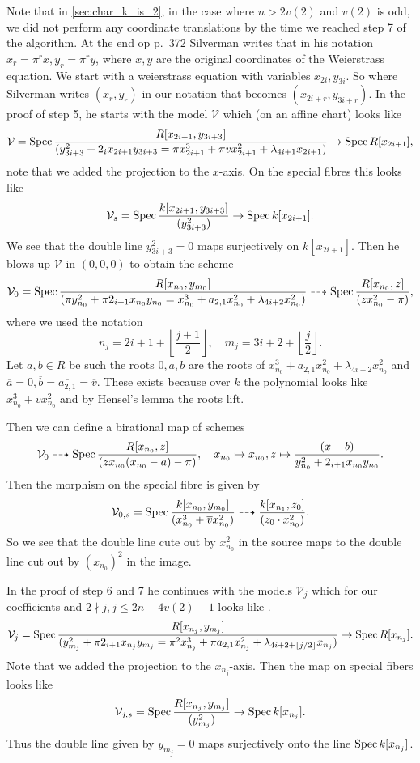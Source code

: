 Note that in \cref{sec:char_k_is_2}, in the case where $n > 2v(2)$ and $v(2)$ is odd, we did not perform any coordinate translations by the time we reached step 7 of the algorithm. 
At the end op p.\ 372 Silverman writes that in his notation $x_{r} = \pi^{r}x, y_{r} = \pi^{r}y$, where $x, y$ are the original coordinates of the Weierstrass equation. 
We start with a weierstrass equation with variables $x_{2i}, y_{3i}$. 
So where Silverman writes $(x_r, y_r)$ in our notation that becomes $(x_{2i+ r}, y_{3i + r})$. 
In the proof of step 5, he starts with the model $\mathcal{V} $ which (on an affine chart) looks like 
\[
	\mathcal{V} = \operatorname{Spec} \frac{R[x_{2i + 1}, y_{3i + 3}]}{(y_{3i + 3}^2 + 2_i x_{2i + 1}y_{3i + 3} = \pi x_{2i + 1}^3 + \pi v x_{2i + 1}^2 + \lambda_{4i + 1} x_{2i + 1})} \to \operatorname{Spec} R[x_{2i + 1}]
,\] 
note that we added the projection to the $x$-axis. 
On the special fibres this looks like 
\[
	\mathcal{V}_s = \operatorname{Spec} \frac{k[x_{2i + 1}, y_{3i + 3}]}{(y_{3i+3}^2)} \to \operatorname{Spec} k[x_{2i + 1}]
.\] 
We see that the double line $y_{3i + 3}^2 = 0$ maps surjectively on $k[x _{2i + 1}]$. 
Then he blows up $\mathcal{V} $ in $(0, 0, 0)$ to obtain the scheme
\[
	\mathcal{V}_0  = \operatorname{Spec} \frac{R[x_{n_0}, y_{m_0}]}{(\pi y_{n_0} ^2 + \pi2_{i + 1} x_{n_0} y_{n_0} = x_{n_0}^3 +  a_{2,1} x_{n_0}^2 + \lambda_{4i + 2} x_{n_0}^2)} \dashrightarrow \operatorname{Spec} \frac{R[x_{n_0}, z]}{(zx_{n_0}^2 - \pi)}
,\] 
where we used the notation \[
	n_j = 2i + 1 + \left\lfloor \frac{j + 1}{2} \right\rfloor,\quad  m_j = 3i + 2 + \left\lfloor \frac{j }{2} \right\rfloor
.\]
Let $a, b \in R$ be such the roots $0, a, b$ are the roots of $x_{n_0}^3 +  a_{2,1} x_{n_0}^2 + \lambda_{4i + 2} x_{n_0}^2$ and $\overline{a} = 0, \overline{b} = \overline{a_{2,1}} = \overline{v}$.  
These exists because over $k$ the polynomial looks like $x_{n_0}^3 + v x_{n_0}^2$ and by Hensel's lemma the roots lift. 

Then we can define a birational map of schemes \[
	\mathcal{V}_0 \dashrightarrow \operatorname{Spec} \frac{R[x_{n_0}, z]}{(z x_{n_0}(x_{n_0} - a) - \pi)},\quad
	x_{n_0} \mapsto x_{n_0}, z\mapsto \frac{(x - b)}{y_{n_0}^2 + 2_{i + 1} x_{n_0}y_{n_0} }
.\] 
Then the morphism on the special fibre is given by \[
	\mathcal{V} _{0, s} = \operatorname{Spec} \frac{k[x_{n_0}, y_{m_0}]}{(x^3_{n_0} + \overline{v} x^2_{n_0})} \dashrightarrow \frac{k[x_{n_1}, z_0]}{(z_0 \cdot x_{n_0}^2)}
.\] 
So we see that the double line cute out by $x_{n_0}^2$ in the source maps to the double line cut out by $(x_{n_0})^2$ in the image. 

In the proof of step 6 and 7 he continues with the models $\mathcal{V} _j$ which for our coefficients and $2 \nmid j, j\le 2n - 4v(2) - 1$ looks like . 
\[
	\mathcal{V} _j = \operatorname{Spec} \frac{R[x_{n_{j}}, y_{m_j}]}{(y_{m_j}^2 + \pi 2_{i + 1} x_{n_j}y_{m_j} = \pi^2 x_{n_j}^3 + \pi a_{2, 1} x_{n_j}^2 + \lambda_{4i + 2 + \left\lfloor j / 2 \right\rfloor} x_{n_j}) } \to \operatorname{Spec} R[x_{n_j}]
.\] 
Note that we added the projection to the $x_{n_j}$-axis. 
Then the map on special fibers looks like \[
	\mathcal{V} _{j, s} = \operatorname{Spec} \frac{R[x_{n_j}, y_{m_j}]}{(y_{m_j}^2)} \to \operatorname{Spec} k[x_{n_j}]
.\] 
Thus the double line given by $y_{m_j} = 0$ maps surjectively onto the line $\operatorname{Spec} k[x_{n_j}]$. 

